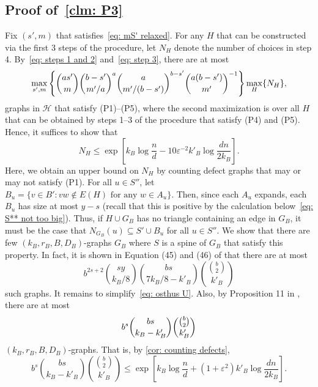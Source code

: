 \documentclass[11pt]{article}
\newcommand{\eps}{\varepsilon}
\theoremstyle{plain}
\begin{document}
\subsection{Proof of~\cref{clm: P3}}
Fix $(s', m)$ that satisfies~\eqref{eq: mS' relaxed}. For any $H$ that can be constructed via the first 3 steps of the procedure, let $N_H$ denote the number of choices in step 4. By~\eqref{eq: steps 1 and 2} and~\eqref{eq: step 3}, there are at most 
\begin{equation}\notag
    \max_{s', m}\left\{\binom{as'}{m}\binom{b - s'}{m'/a}^a\binom{a}{m'/(b - s')}^{b - s'}\binom{a(b - s')}{m'}^{-1} \right\}\max_{H}\{N_H\},
\end{equation}
graphs in $\mathcal H$ that satisfy (P1)--(P5), where the second maximization is over all $H$ that can be obtained by steps 1--3 of the procedure that satisfy (P4) and (P5).
Hence, it suffices to show that 
\begin{equation}\label{eq: desried count}
    N_H \leq \exp\left[k_B\log\frac{n}{d} - 10\eps^{-2}k'_B\log\frac{dn}{2k_B}\right].
\end{equation}
Here, we obtain an upper bound on $N_H$ by counting defect graphs that may or may not satisfy (P1). For all $u \in S''$, let $B_u = \{v \in B' \mathrel : vw \notin E(H) \text{ for any $w \in A_u$}\}$. Then, since each $A_u$ expands, each $B_u$ has size at most $y - s$ (recall that this is positive by the calculation below~\eqref{eq: S** not too big}). Thus, if $H \cup G_B$ has no triangle containing an edge in $G_B$, it must be the case that $N_{G_B}(u) \subseteq S' \cup B_u$ for all $u \in S''$. We show that there are few $(k_B, r_B, B, D_B)$-graphs $G_B$ where $S$ is a spine of $G_B$ that satisfy this property. In fact, it is shown in Equation (45) and (46) of \cite{osthus2003densities} that there are at most 
\begin{equation}\label{eq: osthus U}
    b^{2s + 2}\binom{sy}{k_B/8}\binom{bs}{7k_B/8 - k'_B}\binom{\binom{b}{2}}{k'_B}
\end{equation}
such graphs. It remains to simplify~\eqref{eq: osthus U}. Also, by Proposition 11 in \cite{osthus2003densities}, there are at most 
\begin{equation}\notag
    b^s\binom{bs}{k_B - k'_B}\binom{\binom{b}{2}}{k'_B}    
\end{equation}
$(k_B, r_B,B, D_B)$-graphs. That is, by \cref{cor: counting defects}, 
\begin{equation}
    b^s\binom{bs}{k_B - k'_B}\binom{\binom{b}{2}}{k'_B} \leq \exp\left[k_B\log\frac{n}{d} + (1 + \eps^2)k'_B\log\frac{dn}{2k_B}\right].
\end{equation}
\end{document}
